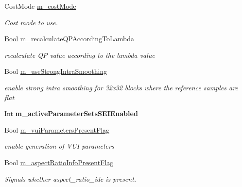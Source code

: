 \begin{DoxyCompactItemize}
\mbox{\label{class_t_app_enc_cfg_af73ff42ba3449653e317dfab9823af73}} 
Cost\+Mode \hyperlink{class_t_app_enc_cfg_af73ff42ba3449653e317dfab9823af73}{m\+\_\+cost\+Mode}
\begin{DoxyCompactList}\small\item\em Cost mode to use. \end{DoxyCompactList}\item 
\mbox{\label{class_t_app_enc_cfg_a2a216305eaeb4ffdf8d2a030b6dadf17}} 
Bool \hyperlink{class_t_app_enc_cfg_a2a216305eaeb4ffdf8d2a030b6dadf17}{m\+\_\+recalculate\+Q\+P\+According\+To\+Lambda}
\begin{DoxyCompactList}\small\item\em recalculate QP value according to the lambda value \end{DoxyCompactList}\item 
\mbox{\label{class_t_app_enc_cfg_a7f302bed43a6d5f827c18b65d8fa8033}} 
Bool \hyperlink{class_t_app_enc_cfg_a7f302bed43a6d5f827c18b65d8fa8033}{m\+\_\+use\+Strong\+Intra\+Smoothing}
\begin{DoxyCompactList}\small\item\em enable strong intra smoothing for 32x32 blocks where the reference samples are flat \end{DoxyCompactList}\item 
\mbox{\label{class_t_app_enc_cfg_a405460ddc1c86850ac5e87d04d0b5983}} 
Int {\bfseries m\+\_\+active\+Parameter\+Sets\+S\+E\+I\+Enabled}
\item 
\mbox{\label{class_t_app_enc_cfg_aa55edb8c4df866f25d10bf9a683a079d}} 
Bool \hyperlink{class_t_app_enc_cfg_aa55edb8c4df866f25d10bf9a683a079d}{m\+\_\+vui\+Parameters\+Present\+Flag}
\begin{DoxyCompactList}\small\item\em enable generation of V\+UI parameters \end{DoxyCompactList}\item 
\mbox{\label{class_t_app_enc_cfg_a2bdc8b567b98e65fa9824b0f23a85c08}} 
Bool \hyperlink{class_t_app_enc_cfg_a2bdc8b567b98e65fa9824b0f23a85c08}{m\+\_\+aspect\+Ratio\+Info\+Present\+Flag}
\begin{DoxyCompactList}\small\item\em Signals whether aspect\+\_\+ratio\+\_\+idc is present. \end{DoxyCompactList}\item 

\end{DoxyCompactItemize}
